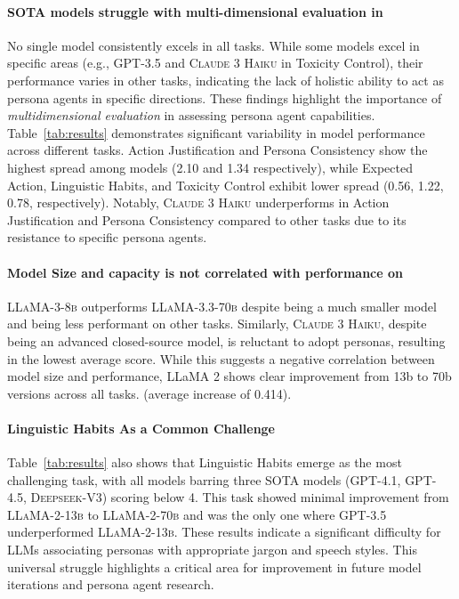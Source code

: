 \paragraph{SOTA models struggle with multi-dimensional evaluation in \benchmark} 

No single model consistently excels in all tasks. While some models excel in specific areas (e.g., \textsc{GPT-3.5} and \textsc{Claude 3 Haiku} in Toxicity Control), their performance varies in other tasks, indicating the lack of holistic ability to act as persona agents in specific directions. These findings highlight the importance of \textit{multidimensional evaluation} in assessing persona agent capabilities.
Table~\ref{tab:results} demonstrates significant variability in model performance across different tasks. Action Justification and Persona Consistency show the highest spread among models (2.10 and 1.34 respectively), while Expected Action, Linguistic Habits, and Toxicity Control exhibit lower spread (0.56, 1.22, 0.78, respectively). Notably, \textsc{Claude 3 Haiku} underperforms in Action Justification and Persona Consistency compared to other tasks due to its resistance to specific persona agents.

\paragraph{Model Size and capacity is not correlated with performance on \benchmark}
\textsc{LLaMA-3-8b} outperforms \textsc{LLaMA-3.3-70b} despite being a much smaller model and being less performant on other tasks. Similarly, \textsc{Claude 3 Haiku}, despite being an advanced closed-source model, is reluctant to adopt personas, resulting in the lowest average score.
While this suggests a negative correlation between model size and performance, LLaMA 2 shows clear improvement from 13b to 70b versions across all tasks. (average increase of 0.414).

\paragraph{Linguistic Habits As a Common Challenge} Table~\ref{tab:results} also shows that Linguistic Habits emerge as the most challenging task, with all models barring three SOTA models (\textsc{GPT-4.1}, \textsc{GPT-4.5}, \textsc{Deepseek-V3}) scoring below 4. This task showed minimal improvement from \textsc{LLaMA-2-13b} to \textsc{LLaMA-2-70b} and was the only one where \textsc{GPT-3.5} underperformed \textsc{LLaMA-2-13b}. These results indicate a significant difficulty for LLMs associating personas with appropriate jargon and speech styles. This universal struggle highlights a critical area for improvement in future model iterations and persona agent research.

